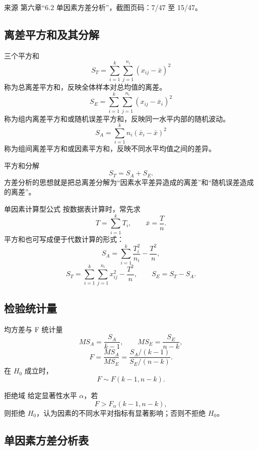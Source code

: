 \documentclass[UTF8,zihao=-4,fontset=fandol]{ctexart}
\begin{document}
\begin{sourcebox}{来源}
第六章“6.2 单因素方差分析”，截图页码：7/47 至 15/47。
\end{sourcebox}

\subsection{离差平方和及其分解}

\begin{keybox}{三个平方和}
\[
S_T=\sum_{i=1}^{k}\sum_{j=1}^{n_i}(x_{ij}-\bar{x})^2
\]
称为总离差平方和，反映全体样本对总均值的离差。
\[
S_E=\sum_{i=1}^{k}\sum_{j=1}^{n_i}(x_{ij}-\bar{x}_i)^2
\]
称为组内离差平方和或随机误差平方和，反映同一水平内部的随机波动。
\[
S_A=\sum_{i=1}^{k}n_i(\bar{x}_i-\bar{x})^2
\]
称为组间离差平方和或因素平方和，反映不同水平均值之间的差异。
\end{keybox}

\begin{keybox}{平方和分解}
\[
S_T=S_A+S_E.
\]
方差分析的思想就是把总离差分解为“因素水平差异造成的离差”和“随机误差造成的离差”。
\end{keybox}

\begin{methodbox}{单因素计算型公式}
按数据表计算时，常先求
\[
T=\sum_{i=1}^{k}T_i,\qquad \bar{x}=\frac{T}{n}.
\]
平方和也可写成便于代数计算的形式：
\[
S_A=\sum_{i=1}^{k}\frac{T_i^2}{n_i}-\frac{T^2}{n},
\]
\[
S_T=\sum_{i=1}^{k}\sum_{j=1}^{n_i}x_{ij}^{2}-\frac{T^2}{n},
\qquad
S_E=S_T-S_A.
\]
\end{methodbox}

\subsection{检验统计量}

\begin{keybox}{均方差与 F 统计量}
\[
MS_A=\frac{S_A}{k-1},\qquad
MS_E=\frac{S_E}{n-k},
\]
\[
F=\frac{MS_A}{MS_E}
=\frac{S_A/(k-1)}{S_E/(n-k)}.
\]
在 $H_0$ 成立时，
\[
F\sim F(k-1,n-k).
\]
\end{keybox}

\begin{methodbox}{拒绝域}
给定显著性水平 $\alpha$，若
\[
F>F_{\alpha}(k-1,n-k),
\]
则拒绝 $H_0$，认为因素的不同水平对指标有显著影响；否则不拒绝 $H_0$。
\end{methodbox}

\subsection{单因素方差分析表}
\end{document}
